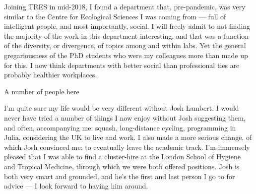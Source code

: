 Joining TRES in mid-2018, I found a department that, pre-pandemic, was very similar to the Centre for Ecological Sciences I was coming from --- full of intelligent people, and most importantly, social.
I will freely admit to not finding the majority of the work in this department interesting, and that was a function of the diversity, or divergence, of topics among and within labs.
Yet the general gregariousness of the PhD students who were my colleagues more than made up for this.
I now think departments with better social than professional ties are probably healthier workplaces.

A number of people here 

I'm quite sure my life would be very different without Josh Lambert.
I would never have tried a number of things I now enjoy without Josh suggesting them, and often, accompanying me: squash, long-distance cycling, programming in Julia, considering the UK to live and work.
I also made a more serious change, of which Josh convinced me: to eventually leave the academic track.
I'm immensely pleased that I was able to find a cluster-hire at the London School of Hygiene and Tropical Medicine, through which we were both offered positions.
Josh is both very smart and grounded, and he's the first and last person I go to for advice --- I look forward to having him around.

\endgroup

